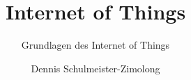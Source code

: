 \title{Internet of Things}
\subtitle{Grundlagen des Internet of Things}
\author{Dennis Schulmeister-Zimolong}

\renewcommand{\ubInstitute}{Studiengang Wirtschaftsinformatik}
\renewcommand{\ubModule}{IoT -- Technical Point of View}
\renewcommand{\ubType}{Aufgaben}
